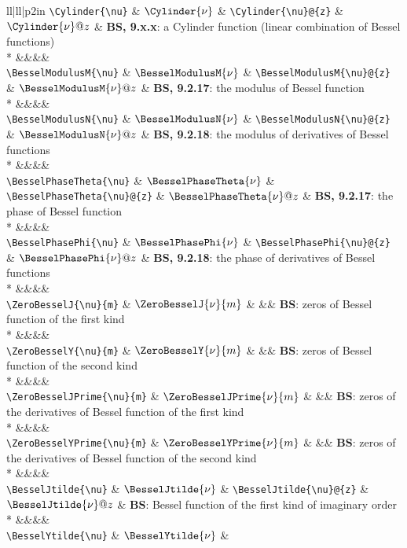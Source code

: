 \begin{supertabular}{ll|ll|p{2in}}
\verb~\Cylinder{\nu}~ & $\Cylinder{\nu}$ & 
\verb~\Cylinder{\nu}@{z}~ & $\Cylinder{\nu}@{z}$ & 
\textbf{BS, 9.x.x}: a Cylinder function (linear combination of Bessel functions)\\*
&&&&\\[-1ex]
\verb~\BesselModulusM{\nu}~ & $\BesselModulusM{\nu}$ & 
\verb~\BesselModulusM{\nu}@{z}~ & $\BesselModulusM{\nu}@{z}$ & 
\textbf{BS, 9.2.17}: the modulus of Bessel function\\*
&&&&\\[-1ex]
\verb~\BesselModulusN{\nu}~ & $\BesselModulusN{\nu}$ & 
\verb~\BesselModulusN{\nu}@{z}~ & $\BesselModulusN{\nu}@{z}$ & 
\textbf{BS, 9.2.18}: the modulus of derivatives of Bessel functions\\*
&&&&\\[-1ex]
\verb~\BesselPhaseTheta{\nu}~ & $\BesselPhaseTheta{\nu}$ & 
\verb~\BesselPhaseTheta{\nu}@{z}~ & $\BesselPhaseTheta{\nu}@{z}$ & 
\textbf{BS, 9.2.17}: the phase of Bessel function\\*
&&&&\\[-1ex]
\verb~\BesselPhasePhi{\nu}~ & $\BesselPhasePhi{\nu}$ & 
\verb~\BesselPhasePhi{\nu}@{z}~ & $\BesselPhasePhi{\nu}@{z}$ & 
\textbf{BS, 9.2.18}: the phase of derivatives of Bessel functions\\*
&&&&\\[-1ex]
\verb~\ZeroBesselJ{\nu}{m}~ & $\ZeroBesselJ{\nu}{m}$ & 
&&
\textbf{BS}: zeros of Bessel function of the first kind\\*
&&&&\\[-1ex]
\verb~\ZeroBesselY{\nu}{m}~ & $\ZeroBesselY{\nu}{m}$ & 
&&
\textbf{BS}: zeros of Bessel function of the second kind\\*
&&&&\\[-1ex]
\verb~\ZeroBesselJPrime{\nu}{m}~ & $\ZeroBesselJPrime{\nu}{m}$ & 
&&
\textbf{BS}: zeros of the derivatives of Bessel function of the first kind\\*
&&&&\\[-1ex]
\verb~\ZeroBesselYPrime{\nu}{m}~ & $\ZeroBesselYPrime{\nu}{m}$ & 
&&
\textbf{BS}: zeros of the derivatives of Bessel function of the second kind\\*
&&&&\\[-1ex]
\verb~\BesselJtilde{\nu}~ & $\BesselJtilde{\nu}$ & 
\verb~\BesselJtilde{\nu}@{z}~ & $\BesselJtilde{\nu}@{z}$ & 
\textbf{BS}: Bessel function of the first kind of imaginary order\\*
&&&&\\[-1ex]
\verb~\BesselYtilde{\nu}~ & $\BesselYtilde{\nu}$ & 

\end{supertabular}
